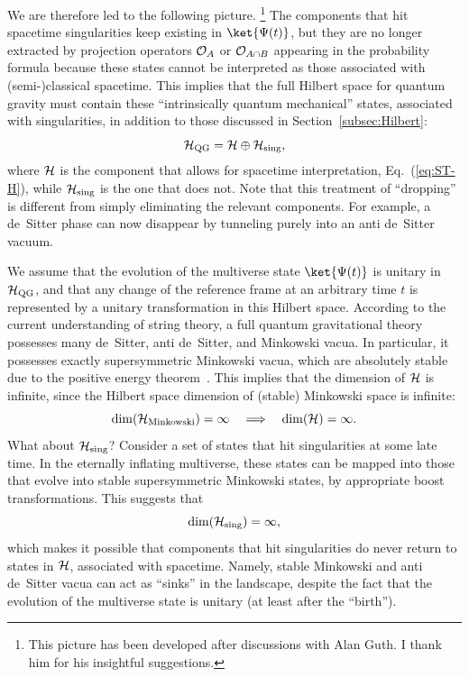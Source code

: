 \documentclass[12pt]{article}
\begin{document}
We are therefore led to the following picture.%
\footnote{This picture has been developed after discussions with Alan 
 Guth.  I thank him for his insightful suggestions.}
The components that hit spacetime singularities keep existing in 
$\ket{\Psi(t)}$, but they are no longer extracted by projection operators 
${\cal O}_A$ or ${\cal O}_{A \cap B}$ appearing in the probability formula 
because these states cannot be interpreted as those associated with 
(semi-)classical spacetime.  This implies that the full Hilbert space 
for quantum gravity must contain these ``intrinsically quantum mechanical'' 
states, associated with singularities, in addition to those discussed 
in Section~\ref{subsec:Hilbert}:
%
\begin{equation}
  {\cal H}_{\rm QG} = {\cal H} \oplus {\cal H}_{\rm sing},
\label{eq:QG-H}
\end{equation}
%
where ${\cal H}$ is the component that allows for spacetime interpretation, 
Eq.~(\ref{eq:ST-H}), while ${\cal H}_{\rm sing}$ is the one that does 
not.  Note that this treatment of ``dropping'' is different from simply 
eliminating the relevant components.  For example, a de~Sitter phase 
can now disappear by tunneling purely into an anti de~Sitter vacuum.

We assume that the evolution of the multiverse state $\ket{\Psi(t)}$ 
is unitary in ${\cal H}_{\rm QG}$, and that any change of the reference 
frame at an arbitrary time $t$ is represented by a unitary transformation 
in this Hilbert space.  According to the current understanding of string 
theory, a full quantum gravitational theory possesses many de~Sitter, 
anti de~Sitter, and Minkowski vacua.  In particular, it possesses exactly 
supersymmetric Minkowski vacua, which are absolutely stable due to the 
positive energy theorem~\cite{Weinberg:1982id}.  This implies that the 
dimension of ${\cal H}$ is infinite, since the Hilbert space dimension 
of (stable) Minkowski space is infinite:
%
\begin{equation}
  {\rm dim}({\cal H}_{\rm Minkowski}) = \infty
\quad\Longrightarrow\quad
  {\rm dim}({\cal H}) = \infty.
\label{eq:dim-ST-inf}
\end{equation}
%
What about ${\cal H}_{\rm sing}$?  Consider a set of states that hit 
singularities at some late time.  In the eternally inflating multiverse, 
these states can be mapped into those that evolve into stable 
supersymmetric Minkowski states, by appropriate boost transformations. 
This suggests that
%
\begin{equation}
  {\rm dim}({\cal H}_{\rm sing}) = \infty,
\label{eq:dim-sing}
\end{equation}
%
which makes it possible that components that hit singularities do never 
return to states in ${\cal H}$, associated with spacetime.  Namely, stable 
Minkowski and anti de~Sitter vacua can act as ``sinks'' in the landscape, 
despite the fact that the evolution of the multiverse state is unitary 
(at least after the ``birth'').
\end{document}

